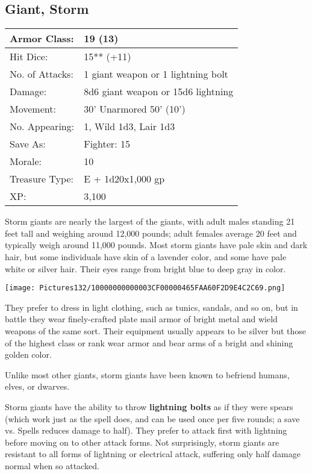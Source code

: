 \documentclass[a4paper,twoside,openany,10pt]{book}
\begin{document}
\begin{multicols}{2}
\subsection*{Giant, Storm}\label{giant-storm}

\begin{tabularx}{0.48\textwidth}{@{}lX@{}}
Armor Class: & 19 (13) \\\hline
Hit Dice: & 15** (+11) \\\hline
No. of Attacks: & 1 giant weapon or 1 lightning bolt \\\hline
Damage: & 8d6 giant weapon or 15d6 lightning \\\hline
Movement: & 30' Unarmored 50'
(10') \\\hline
No. Appearing: & 1, Wild 1d3, Lair 1d3 \\\hline
Save As: & Fighter: 15 \\\hline
Morale: & 10 \\\hline
Treasure Type: & E + 1d20x1,000 gp \\\hline
XP: & 3,100 \\\hline
\end{tabularx}\medskip

Storm giants are nearly the largest of the giants, with adult males standing 21 feet tall and weighing around 12,000 pounds; adult females average 20 feet and typically weigh around 11,000 pounds. Most storm giants have pale skin and dark hair, but some individuals have skin of a lavender color, and some have pale white or silver hair. Their eyes range from bright blue to deep gray in color.

\begin{center}
	\texttt{[image: Pictures132/10000000000003CF00000465FAA60F2D9E4C2C69.png]}
\end{center}

They prefer to dress in light clothing, such as tunics, sandals, and so on, but in battle they wear finely-crafted plate mail armor of bright metal and wield weapons of the same sort. Their equipment usually appears to be silver but those of the highest class or rank wear armor and bear arms of a bright and shining golden color.

Unlike most other giants, storm giants have been known to befriend humans, elves, or dwarves.

Storm giants have the ability to throw \textbf{lightning bolts} as if they were spears (which work just as the spell does, and can be used once per five rounds; a save vs. Spells reduces damage to half). They prefer to attack first with lightning before moving on to other attack forms. Not surprisingly, storm giants are resistant to all forms of lightning or electrical attack, suffering only half damage normal when so attacked.


\end{multicols}
\end{document}
